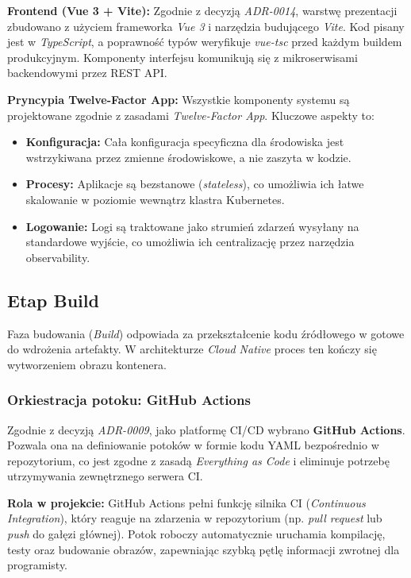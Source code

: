 \textbf{Frontend (Vue 3 + Vite):}
Zgodnie z decyzją \textit{ADR-0014}, warstwę prezentacji zbudowano z użyciem frameworka \textit{Vue 3} i narzędzia budującego \textit{Vite}. Kod pisany jest w \textit{TypeScript}, a poprawność typów weryfikuje \textit{vue-tsc} przed każdym buildem produkcyjnym. Komponenty interfejsu komunikują się z mikroserwisami backendowymi przez REST API.

\textbf{Pryncypia Twelve-Factor App:}
Wszystkie komponenty systemu są projektowane zgodnie z zasadami \textit{Twelve-Factor App}. Kluczowe aspekty to:
\begin{itemize}
    \item \textbf{Konfiguracja:} Cała konfiguracja specyficzna dla środowiska jest wstrzykiwana przez zmienne środowiskowe, a nie zaszyta w kodzie.
    \item \textbf{Procesy:} Aplikacje są bezstanowe (\textit{stateless}), co umożliwia ich łatwe skalowanie w poziomie wewnątrz klastra Kubernetes.
    \item \textbf{Logowanie:} Logi są traktowane jako strumień zdarzeń wysyłany na standardowe wyjście, co umożliwia ich centralizację przez narzędzia observability.
\end{itemize}

\subsection{Etap Build}
Faza budowania (\textit{Build}) odpowiada za przekształcenie kodu źródłowego w gotowe do wdrożenia artefakty. W architekturze \textit{Cloud Native} proces ten kończy się wytworzeniem obrazu kontenera.

\subsubsection{Orkiestracja potoku: GitHub Actions}
Zgodnie z decyzją \textit{ADR-0009}, jako platformę CI/CD wybrano \textbf{GitHub Actions}. Pozwala ona na definiowanie potoków w formie kodu YAML bezpośrednio w repozytorium, co jest zgodne z zasadą \textit{Everything as Code} i eliminuje potrzebę utrzymywania zewnętrznego serwera CI.

\textbf{Rola w projekcie:}
GitHub Actions pełni funkcję silnika CI (\textit{Continuous Integration}), który reaguje na zdarzenia w repozytorium (np. \textit{pull request} lub \textit{push} do gałęzi głównej). Potok roboczy automatycznie uruchamia kompilację, testy oraz budowanie obrazów, zapewniając szybką pętlę informacji zwrotnej dla programisty.

